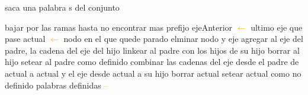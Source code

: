 \begin{algorithm}[H]
\caption{saca una palabra s del conjunto}
\begin{algorithmic}[1]
\STATE bajar por las ramas hasta no encontrar mas prefijo
\STATE ejeAnterior \textcolor{orange}{$\leftarrow$} ultimo eje que pase
\STATE actual \textcolor{orange}{$\leftarrow$} nodo en el que quede parado
		\STATE elminar nodo y eje
		 \STATE {}
		\STATE agregar al eje del padre, la cadena del eje del hijo
		\STATE linkear al padre con los hijos de su hijo
		\STATE borrar al hijo
		\STATE setear al padre como definido
		\ENDIF
	\ELSE
		\STATE {}
		\STATE combinar las cadenas del eje desde el padre de actual a actual y el eje desde actual a su hijo 
		\STATE borrar actual
		\ELSE
				\STATE {}
				\STATE setear actual como no definido
		\ENDIF
	\ENDIF
	\STATE palabras definidas \textcolor{orange}{--}
\end{algorithmic}
\end{algorithm}		